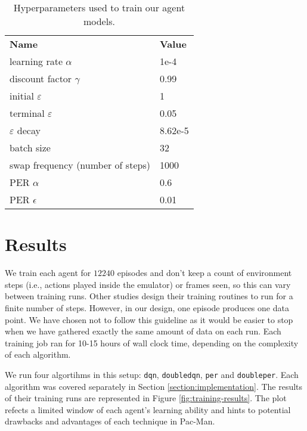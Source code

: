 \begin{table}
    \centering
        \begin{tabular}{ll}
            \textbf{Name}                  & \textbf{Value}   \\
            learning rate $\alpha$             & 1e-4    \\
            discount factor $\gamma$           & 0.99    \\
            initial $\varepsilon$              & 1       \\
            terminal $\varepsilon$             & 0.05    \\
            $\varepsilon$ decay                & 8.62e-5 \\
            batch size                         & 32      \\
            swap frequency (number of steps)   & 1000    \\
            PER $\alpha$                       & 0.6     \\
            PER $\epsilon$                     & 0.01    \\
        \end{tabular}%
        \caption{Hyperparameters used to train our agent models.}
    \label{tab:our-hyperparameters}
\end{table}

\section*{Results}
We train each agent for $12240$ episodes and don't keep a count of environment steps (i.e., actions played inside the emulator) or frames seen, so this can vary between training runs.
Other studies design their training routines to run for a finite number of steps.
However, in our design, one episode produces one data point. We have chosen not to follow this guideline as it would be easier to stop when we have gathered exactly the same amount of data on each run.
Each training job ran for 10-15 hours of wall clock time, depending on the complexity of each algorithm.

We run four algortihms in this setup: \texttt{dqn}, \texttt{doubledqn}, \texttt{per} and \texttt{doubleper}.
Each algorithm was covered separately in Section \ref{section:implementation}.
The results of their training runs are represented in Figure \ref{fig:training-results}.
The plot refects a limited window of each agent's learning ability and hints to potential drawbacks and advantages of each technique in Pac-Man.

